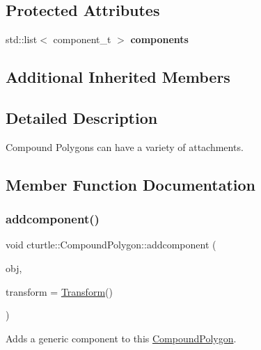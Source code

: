 \subsection*{Protected Attributes}
\begin{DoxyCompactItemize}
\item 
\mbox{\label{classcturtle_1_1CompoundPolygon_aac8199703a019ce5f09fd4ba96c95a39}} 
std\+::list$<$ component\+\_\+t $>$ {\bfseries components}
\end{DoxyCompactItemize}
\subsection*{Additional Inherited Members}


\subsection{Detailed Description}
Compound Polygons can have a variety of attachments. 

\subsection{Member Function Documentation}
\mbox{\label{classcturtle_1_1CompoundPolygon_a9b750af77967c4df01bab83785262e10}} 
\subsubsection{\texorpdfstring{addcomponent()}{addcomponent()}}
{\footnotesize\ttfamily void cturtle\+::\+Compound\+Polygon\+::addcomponent (\begin{DoxyParamCaption}\item[{const \hyperlink{classcturtle_1_1AbstractDrawableObject}{Abstract\+Drawable\+Object} \&}]{obj,  }\item[{const \hyperlink{classcturtle_1_1Transform}{Transform} \&}]{transform = {\ttfamily \hyperlink{classcturtle_1_1Transform}{Transform}()} }\end{DoxyParamCaption})\hspace{0.3cm}{\ttfamily [inline]}}

Adds a generic component to this \hyperlink{classcturtle_1_1CompoundPolygon}{Compound\+Polygon}. \mbox{\label{classcturtle_1_1CompoundPolygon_aee485a61907d0a9c135344eadd5c52ad}} 
